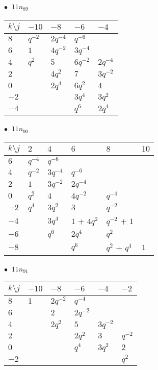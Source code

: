 \begin{minipage}{\linewidth}
$\bullet\ $ $11n_{89}$ \vspace{0.5em} \\
\begin{tabular}{l|llll}
$k \setminus j$ & $-10$ & $-8$ & $-6$ & $-4$ \\
\hline
$8$ & $q^{-2}$ & $2q^{-4}$ & $q^{-6}$ &  \\
$6$ & $1$ & $4q^{-2}$ & $3q^{-4}$ &  \\
$4$ & $q^{2}$ & $5$ & $6q^{-2}$ & $2q^{-4}$ \\
$2$ &  & $4q^{2}$ & $7$ & $3q^{-2}$ \\
$0$ &  & $2q^{4}$ & $6q^{2}$ & $4$ \\
$-2$ &  &  & $3q^{4}$ & $3q^{2}$ \\
$-4$ &  &  & $q^{6}$ & $2q^{4}$ \\
\end{tabular}
\vspace{2em}
\end{minipage}
%
\begin{minipage}{\linewidth}
$\bullet\ $ $11n_{90}$ \vspace{0.5em} \\
\begin{tabular}{l|lllll}
$k \setminus j$ & $2$ & $4$ & $6$ & $8$ & $10$ \\
\hline
$6$ & $q^{-4}$ & $q^{-6}$ &  &  &  \\
$4$ & $q^{-2}$ & $3q^{-4}$ & $q^{-6}$ &  &  \\
$2$ & $1$ & $3q^{-2}$ & $2q^{-4}$ &  &  \\
$0$ & $q^{2}$ & $4$ & $4q^{-2}$ & $q^{-4}$ &  \\
$-2$ & $q^{4}$ & $3q^{2}$ & $3$ & $q^{-2}$ &  \\
$-4$ &  & $3q^{4}$ & $1$ + $4q^{2}$ & $q^{-2}$ + $1$ &  \\
$-6$ &  & $q^{6}$ & $2q^{4}$ & $q^{2}$ &  \\
$-8$ &  &  & $q^{6}$ & $q^{2}$ + $q^{4}$ & $1$ \\
\end{tabular}
\vspace{2em}
\end{minipage}
%
\begin{minipage}{\linewidth}
$\bullet\ $ $11n_{91}$ \vspace{0.5em} \\
\begin{tabular}{l|lllll}
$k \setminus j$ & $-10$ & $-8$ & $-6$ & $-4$ & $-2$ \\
\hline
$8$ & $1$ & $2q^{-2}$ & $q^{-4}$ &  &  \\
$6$ &  & $2$ & $2q^{-2}$ &  &  \\
$4$ &  & $2q^{2}$ & $5$ & $3q^{-2}$ &  \\
$2$ &  &  & $2q^{2}$ & $3$ & $q^{-2}$ \\
$0$ &  &  & $q^{4}$ & $3q^{2}$ & $2$ \\
$-2$ &  &  &  &  & $q^{2}$ \\
\end{tabular}
\vspace{2em}
\end{minipage}

